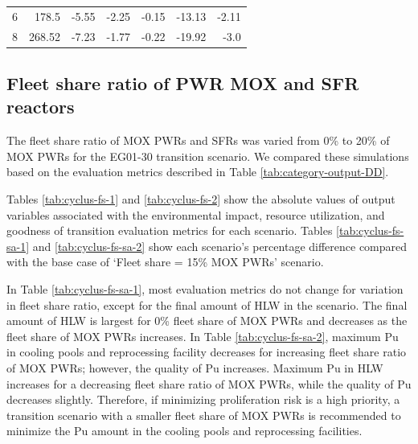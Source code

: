 \begin{table}[]
\begin{tabularx}{\textwidth}{R|RRRRRR}
6  & 178.5            & -5.55                          & -2.25         & -0.15                       & -13.13            & -2.11                           \\
8  & 268.52           & -7.23                          & -1.77         & -0.22                       & -19.92            & -3.0                           \\ \hline
        \end{tabularx}
        \end{table}

\subsection{Fleet share ratio of PWR MOX and SFR reactors}

The fleet share ratio of \gls{MOX} \glspl{PWR} and \glspl{SFR}
was varied from 0\% to 20\% of \gls{MOX} \glspl{PWR} for the 
\Cyclus EG01-30 transition scenario. 
We compared these simulations based on the evaluation 
metrics described in Table \ref{tab:category-output-DD}. 

Tables \ref{tab:cyclus-fs-1} and \ref{tab:cyclus-fs-2} show 
the absolute values of 
output variables associated with the environmental impact, 
resource utilization, and goodness of transition evaluation 
metrics for each scenario. 
Tables \ref{tab:cyclus-fs-sa-1} and \ref{tab:cyclus-fs-sa-2} 
show each scenario's percentage 
difference compared with the base case of `Fleet share = 15\% 
\gls{MOX} \glspl{PWR}' scenario. 

In Table \ref{tab:cyclus-fs-sa-1}, most evaluation metrics do not change 
for variation in fleet share ratio, except for the final 
amount of HLW in the scenario. 
The final amount of HLW is largest for 0\% fleet share of \gls{MOX} 
\glspl{PWR} and decreases as the fleet share of \gls{MOX} \glspl{PWR} 
increases. 
In Table \ref{tab:cyclus-fs-sa-2}, maximum Pu in cooling pools and 
reprocessing facility 
decreases for increasing fleet share ratio of \gls{MOX} \glspl{PWR}; 
however, the quality of Pu increases. 
Maximum Pu in HLW increases for a decreasing fleet share ratio
of \gls{MOX} \glspl{PWR}, while the quality of Pu decreases slightly.
Therefore, if minimizing proliferation risk is a high priority, 
a transition scenario 
with a smaller fleet share of \gls{MOX} \glspl{PWR} is recommended
to minimize the Pu amount in the cooling pools and reprocessing facilities. 

